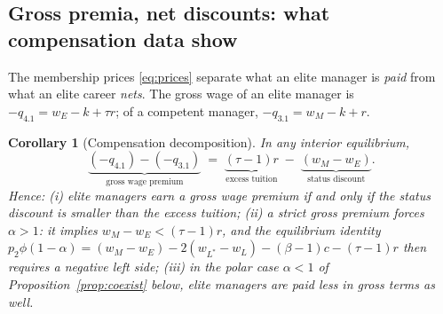\documentclass[12pt,letterpaper]{article}
\newtheorem{corollary}{Corollary}
\theoremstyle{definition}
\begin{document}
\subsection{Gross premia, net discounts: what compensation data show}

The membership prices \eqref{eq:prices} separate what an elite manager is \emph{paid} from what an elite career \emph{nets}.
The gross wage of an elite manager is $-q_{4.1} = w_E - k + \tau r$; of a competent manager, $-q_{3.1} = w_M - k + r$.

\begin{corollary}[Compensation decomposition]\label{cor:wages} In any interior equilibrium,
\begin{equation}\label{eq:wagedecomp}
  \underbrace{(-q_{4.1}) - (-q_{3.1})}_{\text{gross wage premium}}
  \;=\;
  \underbrace{(\tau-1)r}_{\text{excess tuition}}
  \;-\;
  \underbrace{(w_M - w_E)}_{\text{status discount}} .
\end{equation}
Hence: (i) elite managers earn a gross wage premium if and only if the status discount is smaller than the excess tuition; (ii) a strict gross premium forces $\alpha>1$: it implies $w_M-w_E<(\tau-1)r$, and the equilibrium identity $p_2\phi(1-\alpha) = (w_M-w_E) - 2(w_{L^\ast}-w_L) - (\beta-1)c - (\tau-1)r$ then requires a negative left side; (iii) in the polar case $\alpha<1$ of Proposition~\ref{prop:coexist} below, elite managers are paid less in gross terms as well.
\end{corollary}
\end{document}
